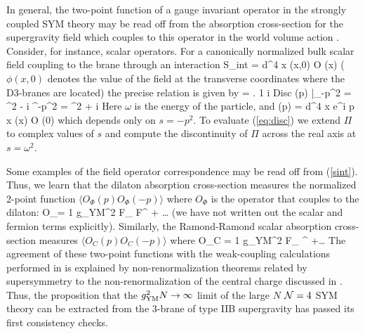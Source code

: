 In general, the two-point function of a gauge invariant operator in
the strongly coupled SYM theory may be read off from the
absorption cross-section for the supergravity field which
couples to this operator in the world volume action \cite{gkThree,KTV}.
Consider, for instance, scalar operators.
For a canonically normalized bulk scalar field coupling to the
brane through an interaction
\be
S_{\rm int} = \int d^4 x \phi (x,0) {\cal O} (x)
\ee
($\phi(x,0)$ denotes the value of the field at the transverse
coordinates where the D3-branes are located)
the precise relation is given by
\be
\label{eq:disc}
\sigma = \left. {1  i \omega}  {\rm Disc}\; \Pi (p) \right|_{-p^2
=
\omega^2 - i \epsilon}^{-p^2 = \omega^2 + i \epsilon}
\ee
Here $\omega$ is the energy of the particle, and
\be
\Pi(p) = \int d^4 x e^{i p \cdot x} (x) {\cal O} (0)
\rangle
\ee
which depends only on $s=-p^2$. To evaluate (\ref{eq:disc}) we extend
$\Pi$ to  complex values of $s$ and compute the discontinuity of $\Pi$
across the real axis at $s=\omega^2$.

Some examples of the field operator correspondence may
be read off from (\ref{sint}). Thus, we learn that the dilaton
absorption cross-section measures the normalized 2-point function
$\langle O_\Phi  (p) O_\Phi (-p) \rangle$ where $O_\Phi$
is the operator that couples to the dilaton: 
\be
O_\Phi = {1 g_{\rm YM}^2 }\tr F_{\alpha\beta} F^{\alpha\beta} + \ldots 
\ee
(we have not written out the scalar and fermion terms explicitly).
Similarly,
the Ramond-Ramond scalar absorption cross-section measures  
$\langle O_C  (p) O_C (-p) \rangle$ where 
\be
O_C = 
{1 g_{\rm YM}^2 }\tr F_{\alpha\beta} ^{\alpha\beta} 
+\ldots \ee
The agreement of these two-point functions
with the weak-coupling calculations performed in
\cite{kleb,gukt} is explained by non-renormalization
theorems related by supersymmetry to the
non-renormalization of the central charge discussed in
\cite{gkThree}. 
Thus, the proposition that the $g_{\rm YM}^2 N\rightarrow
\infty$ limit of the large $N$ ${\cal N}=4$ SYM theory can be extracted from 
the 3-brane of type IIB supergravity has passed its first consistency checks.

